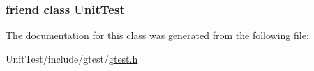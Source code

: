 \hypertarget{classtesting_1_1_test_result_a832b4d233efee1a32feb0f4190b30d39}{
\subsubsection[{Unit\+Test}]{\setlength{\rightskip}{0pt plus 5cm}friend class {\bf Unit\+Test}\hspace{0.3cm}{\ttfamily [friend]}}}\label{classtesting_1_1_test_result_a832b4d233efee1a32feb0f4190b30d39}


The documentation for this class was generated from the following file\+:\begin{DoxyCompactItemize}
\item 
Unit\+Test/include/gtest/\hyperlink{gtest_8h}{gtest.\+h}\end{DoxyCompactItemize}
